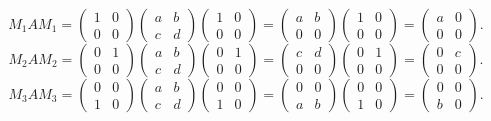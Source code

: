 \documentclass[11pt, letterpaper]{article}
\begin{document}
\[
	M_1AM_1=\begin{pmatrix}
	1 & 0 \\
	0 & 0
	\end{pmatrix}\begin{pmatrix}
	a & b \\
	c & d
	\end{pmatrix}\begin{pmatrix}
	1 & 0 \\
	0 & 0
	\end{pmatrix}=\begin{pmatrix}
	a & b \\
	0 & 0
	\end{pmatrix}\begin{pmatrix}
	1 & 0 \\
	0 & 0
	\end{pmatrix}=\begin{pmatrix}
	a & 0 \\
	0 & 0
	\end{pmatrix}
.\]
\[
	M_2AM_2=\begin{pmatrix}
	0 & 1 \\
	0 & 0
	\end{pmatrix}\begin{pmatrix}
	a & b \\
	c & d
	\end{pmatrix}\begin{pmatrix}
	0 & 1 \\
	0 & 0
	\end{pmatrix}=\begin{pmatrix}
	c & d \\
	0 & 0
	\end{pmatrix}\begin{pmatrix}
	0 & 1 \\
	0 & 0
	\end{pmatrix}=\begin{pmatrix}
	0 & c \\
	0 & 0
	\end{pmatrix}
.\]
\[
	M_3AM_3=\begin{pmatrix}
	0 & 0 \\
	1 & 0
	\end{pmatrix}\begin{pmatrix}
	a & b \\
	c & d
	\end{pmatrix}\begin{pmatrix}
	0 & 0 \\
	1 & 0
	\end{pmatrix}=\begin{pmatrix}
	0 & 0 \\
	a & b
	\end{pmatrix}\begin{pmatrix}
	0 & 0 \\
	1 & 0
	\end{pmatrix}=\begin{pmatrix}
	0 & 0 \\
	b & 0
	\end{pmatrix}
.\]
\end{document}
